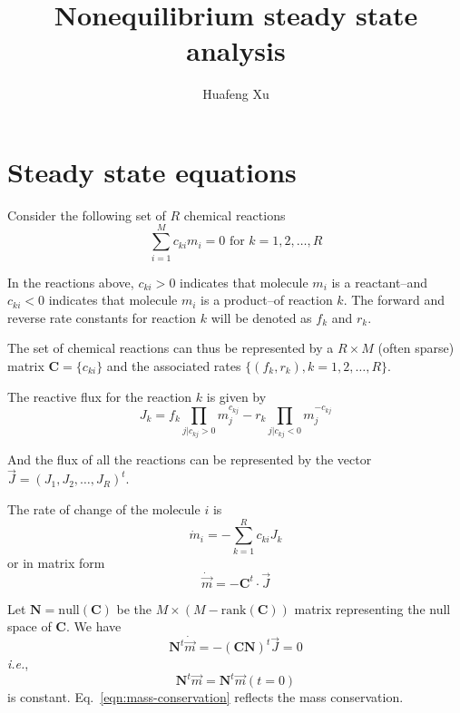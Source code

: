 \documentclass[aps,groupedaddress]{revtex4}
\newcommand*{\mat}[1]{\mathbf{#1}}
\newcommand*{\nullspace}[1]{\mathrm{null}(#1)}
\newcommand*{\rank}[1]{\mathrm{rank}({#1})}
\begin{document}
\title{Nonequilibrium steady state analysis}

\author{Huafeng Xu}

\maketitle

\section{Steady state equations}

Consider the following set of $R$ chemical reactions
\begin{equation}
\sum_{i=1}^{M} c_{ki} m_i = 0  \text{ for } k=1,2,\dots,R
\label{eqn:set-of-reactions}
\end{equation}

In the reactions above, $c_{ki} > 0$ indicates that molecule $m_i$ is
a reactant--and $c_{ki} < 0$ indicates that molecule $m_i$ is a
product--of reaction $k$.  The forward and reverse rate constants for
reaction $k$ will be denoted as $f_k$ and $r_k$.

The set of chemical reactions can thus be represented by a $R\times M$
(often sparse) matrix $\mat{C} = \{ c_{ki} \}$ and the associated
rates $\{ (f_k, r_k), k=1,2,\dots,R \}$.

The reactive flux for the reaction $k$ is given by
\begin{equation}
J_k = f_k \prod_{j|c_{kj}>0} m_j^{c_{kj}} - r_k \prod_{j|c_{kj}<0} m_j^{-c_{kj}}
\label{eqn:reaction-flux}
\end{equation}

And the flux of all the reactions can be represented by the vector 
$\vec{J} = (J_1, J_2, \dots, J_R)^t$.

The rate of change of the molecule $i$ is
\begin{equation}
\dot{m}_i = - \sum_{k=1}^R c_{ki} J_k 
\end{equation}
%
or in matrix form
\begin{equation}
\dot{\vec{m}} = - \mat{C}^t\cdot \vec{J}
\label{eqn:rate-of-change}
\end{equation}

Let $\mat{N} = \nullspace{\mat{C}}$ be the $M\times (M-\rank{\mat{C}})$
matrix representing the null space of $\mat{C}$.  We have
\begin{equation}
\mat{N}^t \dot{\vec{m}} = -(\mat{C} \mat{N})^t \vec{J} = 0
\end{equation}
{\it i.e.},
\begin{equation}
\mat{N}^t \vec{m} = \mat{N}^t \vec{m}(t=0)
\label{eqn:mass-conservation}
\end{equation}
is constant.  Eq.~\ref{eqn:mass-conservation} reflects the mass
conservation.
\end{document}
